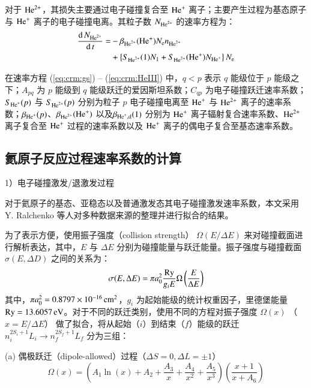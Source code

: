 对于 ${\rm He}^{2+}$，其损失主要通过电子碰撞复合至 ${\rm He}^+$ 离子；主要产生过程为基态原子与 ${\rm He}^+$ 离子的电子碰撞电离。其粒子数 $N_{{\rm He}^{2+}}$ 的速率方程为：
\begin{equation}
\label{eq:crm:HeIII}
\begin{aligned}
\frac{{\rm d}\,N_{{\rm He}^{2+}}}{{\rm d}\,t}=
&-\beta_{{\rm He}^{2+}}({\rm He}^{+})N_{\rm e}n_{{\rm He}^{2+}}\\
&+\left\{S_{{\rm He}^{2+}}(1)N_1+S_{{\rm He}^{2+}}({\rm He}^+)N_{{\rm He}^+}\right\}N_{\rm e}
\end{aligned}
\end{equation}

在速率方程 (\ref{eq:crm:gs}) -- (\ref{eq:crm:HeIII}) 中，$q<p$ 表示 $q$ 能级位于 $p$ 能级之下；$A_{pq}$ 为 $p$ 能级到 $q$ 能级跃迁的爱因斯坦系数；$C_{qp}$ 为电子碰撞跃迁速率系数；$S_{{\rm He}^+}(p)$ 与 $S_{{\rm He}^{2+}}(p)$ 分别为粒子 $p$ 电子碰撞电离至 ${\rm He}^+$ 与 ${\rm He}^{2+}$ 离子的速率系数；$\beta_{{\rm He}^+}(p)$、$\beta_{{\rm He}^{2+}}({\rm He}^+)$ 以及$\beta_{{\rm He}^+,{\rm d}}(1)$ 分别为 ${\rm He}^+$ 离子辐射复合速率系数、${\rm He}^{2+}$ 离子复合至 ${\rm He}^+$ 过程的速率系数以及 ${\rm He}^+$ 离子的偶电子复合至基态速率系数。

\subsection{氦原子反应过程速率系数的计算}

1）电子碰撞激发/退激发过程

对于氦原子的基态、亚稳态以及普通激发态其电子碰撞激发速率系数，本文采用 Y. Ralchenko 等人\cite{Ralchenko2008603,NIFS:DATA:059}对多种数据来源的整理并进行拟合的结果。

为了表示方便，使用振子强度（collision strength） $\Omega(E/\Delta E)$ 来对碰撞截面进行解析表达，其中，$E$ 与 $\Delta E$ 分别为碰撞能量与跃迁能量。振子强度与碰撞截面 $\sigma(E, \Delta D)$ 之间的关系为：
\begin{equation}
    \label{eq:chap03:col-strength-xsec}
    \sigma(E, \Delta E)=\pi a_0^2 \frac{{\rm Ry}}{g_i E}\Omega\left(\frac{E}{\Delta E}\right)
\end{equation}
其中，$\pi a_0^2=0.8797\times10^{-16}\,{\rm cm}^2$，$g_i$ 为起始能级的统计权重因子，里德堡能量 ${\rm Ry}=13.6057\,{\rm eV}$。对于不同的跃迁类别，使用不同的方程对振子强度 $\Omega(x)$ （$x=E/\Delta E$） 做了拟合，将从起始（$i$）到结束（$f$）能级的跃迁 $n_i^{2S_i+1}L_i\to n_f^{2S_f+1}L_f$ 分为三组：

(a) 偶极跃迁（dipole-allowed）过程（$\Delta S=0, \Delta L=\pm 1$）
\begin{equation}
    \Omega(x)=\left(A_1\ln(x)+A_2+\frac{A_3}{x}+\frac{A_4}{x^2}+\frac{A_5}{x^3}\right)\left(\frac{x+1}{x+A_6}\right)
\end{equation}

